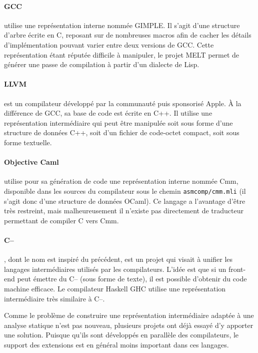 \paragraph{GCC} utilise une représentation interne nommée
GIMPLE\cite{gcc-gimple}. Il s'agit d'une structure d'arbre écrite en C, reposant
sur de nombreuses macros afin de cacher les détails d'implémentation pouvant
varier entre deux versions de GCC. Cette représentation étant réputée difficile
à manipuler, le projet MELT\cite{gcc-melt} permet de générer une passe de
compilation à partir d'un dialecte de Lisp.

\paragraph{LLVM}\cite{llvm-pres} est un compilateur développé par la communauté
puis sponsorisé Apple. À la différence de GCC, sa base de code est écrite en
C++. Il utilise une représentation intermédiaire qui peut être manipulée soit
sous forme d'une structure de données C++, soit d'un fichier de code-octet
compact, soit sous forme textuelle.

\paragraph{Objective Caml} utilise pour sa génération de code
une représentation interne nommée Cmm, disponible dans les sources du
compilateur sous le chemin \texttt{asmcomp/cmm.mli} (il s'agit donc d'une
structure de données OCaml). Ce langage a l'avantage d'être très restreint, mais
malheureusement il n'existe pas directement de traducteur permettant de compiler
C vers Cmm.

\paragraph{C--}\cite{spjcmm} , dont le nom est inspiré du précédent,
est un projet qui visait à unifier les langages intermédiaires utilisés par les
compilateurs. L'idée est que si un front-end peut émettre du C-- (sous forme de
texte), il est possible d'obtenir du code machine efficace. Le compilateur
Haskell GHC utilise une représentation intermédiaire très similaire à C--.

Comme le problème de construire une représentation intermédiaire adaptée à une
analyse statique n'est pas nouveau, plusieurs projets ont déjà essayé d'y
apporter une solution. Puisque qu'ils sont développés en parallèle des
compilateurs, le support des extensions est en général moins important dans ces
langages.

